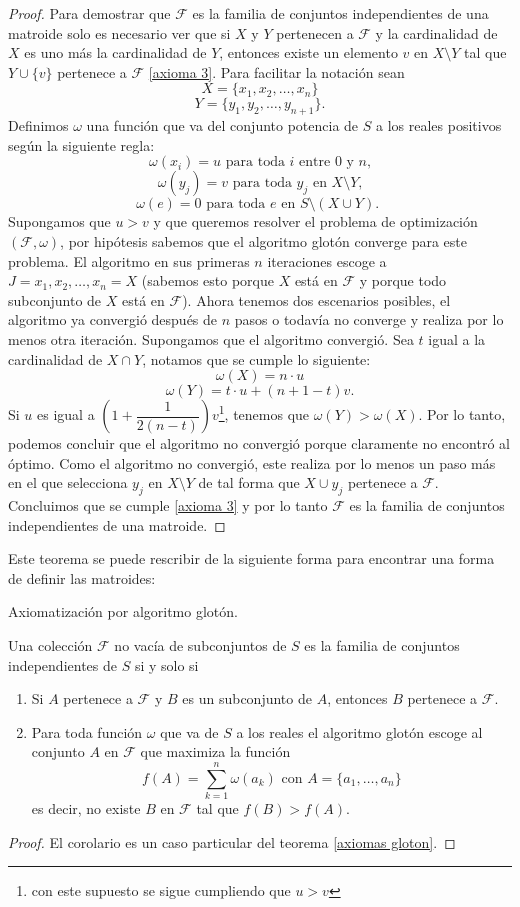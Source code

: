 \begin{proof}
Para demostrar que $\mathcal{F}$ es la familia de conjuntos independientes de una matroide solo es necesario ver que si $X$ y $Y$ pertenecen a $\mathcal{F}$ y la cardinalidad de $X$ es uno más la cardinalidad de $Y$, entonces existe un elemento $v$ en $X \setminus Y$ tal que $Y \cup \{v\} $ pertenece a $\mathcal{F}$ \ref{axioma 3}. Para facilitar la notación sean 
$$X = \{x_1,x_2,\dots,x_n \}$$ $$Y = \{y_1,y_2,\dots,y_{n+1}\}.$$
Definimos $\omega$ una función que va del conjunto potencia de $S$ a los reales positivos según la siguiente regla:
$$\omega(x_i)=u \text{ para toda $i$ entre $0$ y $n$,}$$
$$\omega(y_j)=v \text{ para toda $y_j$ en $X \setminus Y$,}$$
$$\omega(e)=0 \text{ para toda $e$ en $S \setminus(X \cup Y)$. }$$
Supongamos que $u>v$ y que queremos resolver el problema de optimización $(\mathcal{F}, \omega)$, por hipótesis sabemos que el algoritmo glotón converge para este problema. El algoritmo en sus primeras $n$ iteraciones escoge a $J={x_1,x_2,\dots,x_n}=X$ (sabemos esto porque $X$ está en $\mathcal{F}$ y porque todo subconjunto de $X$ está en $\mathcal{F}$). Ahora tenemos dos escenarios posibles, el algoritmo ya convergió después de $n$ pasos o todavía no converge y realiza por lo menos otra iteración. 
Supongamos que el algoritmo convergió. Sea $t$ igual a la cardinalidad de $X \cap Y$, notamos que se cumple lo siguiente:
$$\omega(X)= n\cdot u$$
$$\omega(Y) = t \cdot u + (n+1-t)v.$$
Si $u$ es igual a $\left(1+\dfrac{1}{2(n-t)}\right)v$\footnote{con este supuesto se sigue cumpliendo que $u>v$}, tenemos que $ \omega(Y) > \omega(X)$. Por lo tanto, podemos concluir que el algoritmo no convergió porque claramente no encontró al óptimo. Como el algoritmo no convergió, este realiza por lo menos un paso más en el que selecciona $y_j$ en $X \setminus Y$ de tal forma que $X \cup {y_j}$ pertenece a $\mathcal{F}$. Concluimos que se cumple \ref{axioma 3} y por lo tanto $\mathcal{F}$ es la familia de conjuntos independientes de una matroide. 
\end{proof}

Este teorema se puede rescribir de la siguiente forma para encontrar una forma de definir las matroides:

\begin{cor}{Axiomatización por algoritmo glotón.}

Una colección $\mathcal{F}$ no vacía de subconjuntos de $S$ es la familia de conjuntos independientes de $S$ si y solo si 
\begin{enumerate}
\item Si $A$ pertenece a $\mathcal{F}$ y $B$ es un subconjunto de $A$, entonces $B$ pertenece a $\mathcal{F}$.
\item Para toda función $\omega$ que va de $S$ a los reales el algoritmo glotón escoge al conjunto $A$ en $\mathcal{F}$ que maximiza la función 
$$f(A) = \sum_{k=1}^{n}\omega(a_k) \text{ con } A=\{a_1,\dots,a_n\}$$ es decir, no existe $B$ en $\mathcal{F}$ tal que $f(B)>f(A)$.
\end{enumerate}
\end{cor}

\begin{proof}
El corolario es un caso particular del teorema \ref{axiomas gloton}.
\end{proof}



